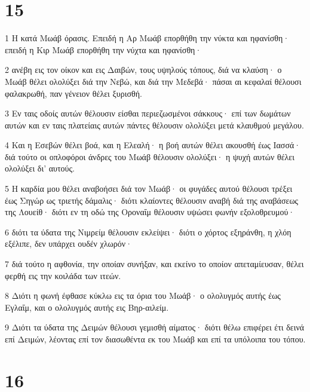 \chapter{15}

\par 1 Η κατά Μωάβ όρασις. Επειδή η Αρ Μωάβ επορθήθη την νύκτα και ηφανίσθη· επειδή η Κιρ Μωάβ επορθήθη την νύχτα και ηφανίσθη·
\par 2 ανέβη εις τον οίκον και εις Δαιβών, τους υψηλούς τόπους, διά να κλαύση· ο Μωάβ θέλει ολολύξει διά την Νεβώ, και διά την Μεδεβά· πάσαι αι κεφαλαί θέλουσι φαλακρωθή, παν γένειον θέλει ξυρισθή.
\par 3 Εν ταις οδοίς αυτών θέλουσιν είσθαι περιεζωσμένοι σάκκους· επί των δωμάτων αυτών και εν ταις πλατείαις αυτών πάντες θέλουσιν ολολύξει μετά κλαυθμού μεγάλου.
\par 4 Και η Εσεβών θέλει βοά, και η Ελεαλή· η βοή αυτών θέλει ακουσθή έως Ιασσά· διά τούτο οι οπλοφόροι άνδρες του Μωάβ θέλουσιν ολολύξει· η ψυχή αυτών θέλει ολολύξει δι' αυτούς.
\par 5 Η καρδία μου θέλει αναβοήσει διά τον Μωάβ· οι φυγάδες αυτού θέλουσι τρέξει έως Σηγώρ ως τριετής δάμαλις· διότι κλαίοντες θέλουσιν αναβή διά της αναβάσεως της Λουείθ· διότι εν τη οδώ της Οροναΐμ θέλουσιν υψώσει φωνήν εξολοθρευμού·
\par 6 διότι τα ύδατα της Νιμρείμ θέλουσιν εκλείψει· διότι ο χόρτος εξηράνθη, η χλόη εξέλιπε, δεν υπάρχει ουδέν χλωρόν·
\par 7 διά τούτο η αφθονία, την οποίαν συνήξαν, και εκείνο το οποίον απεταμίευσαν, θέλει φερθή εις την κοιλάδα των ιτεών.
\par 8 Διότι η φωνή έφθασε κύκλω εις τα όρια του Μωάβ· ο ολολυγμός αυτής έως Εγλαΐμ, και ο ολολυγμός αυτής εις Βηρ-αιλείμ.
\par 9 Διότι τα ύδατα της Δειμών θέλουσι γεμισθή αίματος· διότι θέλω επιφέρει έτι δεινά επί Δειμών, λέοντας επί τον διασωθέντα εκ του Μωάβ και επί τα υπόλοιπα του τόπου.

\chapter{16}

